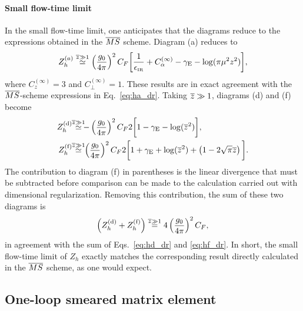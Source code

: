 \paragraph{Small flow-time limit} In the small flow-time limit, one anticipates that the diagrams reduce to the expressions obtained in the $\overline{MS}$ scheme. Diagram (a) reduces to
\begin{equation}
Z_h^{(a)}  \stackrel{\overline{z} \gg 1}{\simeq}\left(\frac{g_0}{4\pi}\right)^2C_F \bigg[\frac{1}{\epsilon_{\scriptscriptstyle\mathrm{IR}}} + C^{(\infty)}_\alpha-\gamma_{\mathrm{E}}-\log(\pi\mu^2z^2) \bigg],
\end{equation}
where $C^{(\infty)}_z = 3$ and $C^{(\infty)}_\perp = 1$. These results are in exact agreement with the $\overline{MS}$-scheme expressions in Eq.~\ref{eq:ha_dr}.
Taking $\overline{z} \gg 1$, diagrams (d) and (f) become
\begin{align}
Z_h^\mathrm{(d)}\!\! \stackrel{\oz \gg 1}{\simeq} {} & \!\!\!{-}\left(\frac{g_0}{4\pi}\right)^2C_F 2\bigg[1-\gE-\log(\oz^2) \bigg],\\
Z_h^\mathrm{(f)}\!\! \stackrel{\oz \gg 1}{\simeq} {} & \!\!\!\left(\frac{g_0}{4\pi}\right)^2C_F 2\bigg[1+\gE+\log(\oz^2)  +\left(1-2\sqrt{\pi}\oz\right) \bigg].
\end{align}
The contribution to diagram (f) in parentheses is the linear divergence that must be subtracted before comparison can be made to the calculation carried out with dimensional regularization. Removing this contribution, the sum of these two diagrams is
\begin{equation}
\left(Z_h^\mathrm{(d)} +Z_h^\mathrm{(f)}\right)\stackrel{\overline{z} \gg 1}{=} 4\left(\frac{g_0}{4\pi}\right)^2C_F,\label{eq:hoztoinfty}
\end{equation}
in agreement with the sum of Eqs.~\eqref{eq:hd_dr} and \eqref{eq:hf_dr}. In short, the small flow-time limit of $Z_h$ exactly matches the corresponding result directly calculated in the $\overline{MS}$ scheme, as one would expect.


\subsection{One-loop smeared matrix element}

